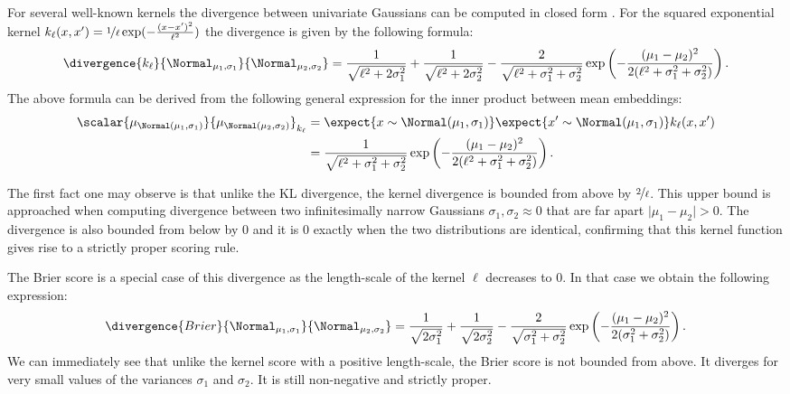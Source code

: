 For several well-known kernels the divergence between univariate Gaussians can be computed in closed form \citep{Song2008}. For the squared exponential kernel $k_{\ell}(x,x')=\nicefrac{1}{\ell}\exp(-\frac{(x-x')^2}{\ell^2})$ the divergence is given by the following formula:
%
\begin{equation}
	\divergence{k_{\ell}}{\Normal_{\mu_1,\sigma_1}}{\Normal_{\mu_2,\sigma_2}} = \frac{1}{\sqrt{\ell^2+2\sigma_1^2}} + \frac{1}{\sqrt{\ell^2+2\sigma_2^2}} - \frac{2}{\sqrt{\ell^2+\sigma_1^2 + \sigma_2^2}}\exp\left(-\frac{(\mu_1 - \mu_2)^2}{2(\ell^2 + \sigma_1^2 + \sigma_2^2)}\right).
\end{equation}
%
The above formula can be derived from the following general expression for the inner product between mean embeddings:
%
\begin{align}
	\scalar{\mu_{\Normal(\mu_1,\sigma_1)}}{\mu_{\Normal(\mu_2,\sigma_2)}}_{k_{\ell}} &= \expect{x\sim \Normal(\mu_1,\sigma_1)}\expect{x' \sim \Normal(\mu_1,\sigma_1)} k_{\ell}(x,x')\\
	&= \frac{1}{\sqrt{\ell^2 + \sigma_1^2 + \sigma_2^2}}\exp\left(-\frac{(\mu_1 - \mu_2)^2}{2(\ell^2 + \sigma_1^2 + \sigma_2^2)}\right).
\end{align} 

The first fact one may observe is that unlike the KL divergence, the kernel divergence is bounded from above by $\nicefrac{2}{\ell}$. This upper bound is approached when computing divergence between two infinitesimally narrow Gaussians $\sigma_1,\sigma_2\approx 0$ that are far apart $\vert \mu_1 - \mu_2 \vert > 0$. The divergence is also bounded from below by $0$ and it is $0$ exactly when the two distributions are identical, confirming that this kernel function gives rise to a strictly proper scoring rule.

The Brier score is a special case of this divergence as the length-scale of the kernel $\ell$ decreases to $0$. In that case we obtain the following expression:
%
\begin{equation}
	\divergence{Brier}{\Normal_{\mu_1,\sigma_1}}{\Normal_{\mu_2,\sigma_2}} = \frac{1}{\sqrt{2\sigma_1^2}} + \frac{1}{\sqrt{2\sigma_2^2}} - \frac{2}{\sqrt{\sigma_1^2 + \sigma_2^2}}\exp\left(-\frac{(\mu_1 - \mu_2)^2}{2(\sigma_1^2 + \sigma_2^2)}\right).
\end{equation}
%
We can immediately see that unlike the kernel score with a positive length-scale, the Brier score is not bounded from above. It diverges for very small values of the variances $\sigma_1$ and $\sigma_2$. It is still non-negative and strictly proper.


